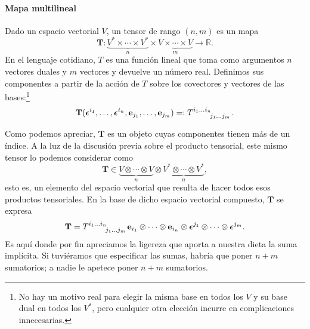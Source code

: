 \paragraph{Mapa multilineal} Dado un espacio vectorial \(V\), un tensor de rango \((n,m)\) es un mapa 
\begin{equation}
    \mathbf{T}: \underset{n}{\underbrace{V^*\times\cdots\times V^*}} \times\underset{m}{\underbrace{V\times\cdots\times V}} \rightarrow \mathbb{R}.
\end{equation}
En el lenguaje cotidiano, \(T\) es una función lineal que toma como argumentos \(n\) vectores duales y \(m\) vectores y devuelve un número real. Definimos sus componentes a partir de la acción de \(T\) sobre los covectores y vectores de las bases:\footnote{No hay un motivo real para elegir la misma base en todos los \(V\) y su base dual en todos los \(V^*\), pero cualquier otra elección incurre en complicaciones innecesarias.}
\begin{equation}
    \mathbf{T}(\boldsymbol{\epsilon}^{i_1}, \dots, \boldsymbol{\epsilon}^{i_n},\mathbf{e}_{j_1}, \dots, \mathbf{e}_{j_m}) =: \tensor{T}{^{i_1}^{...}^{i_n}_{j_1}_{...}_{j_m}}.
\end{equation}

Como podemos apreciar, \(\mathbf{T}\) es un objeto cuyas componentes tienen más de un índice. A la luz de la discusión previa sobre el producto tensorial, este mismo tensor lo podemos considerar como 
\begin{equation}
    \mathbf{T}\in \underset{n}{\underbrace{V\otimes \cdots\otimes V}}\otimes\underset{n}{\underbrace{V^*\otimes \cdots\otimes V^*}},
\end{equation}
esto es, un elemento del espacio vectorial que resulta de hacer todos esos productos tensoriales. En la base de dicho espacio vectorial compuesto, \(\mathbf{T}\) se expresa 
\begin{equation}
    \mathbf{T} = \tensor{T}{^{i_1}^{...}^{i_n}_{j_1}_{...}_{j_m}} \mathbf{e}_{i_1}\otimes\cdots\otimes\mathbf{e}_{i_n}\otimes\boldsymbol{\epsilon}^{j_1}\otimes\cdots\otimes\boldsymbol{\epsilon}^{j_m}.
\end{equation}
Es aquí donde por fin apreciamos la ligereza que aporta a nuestra dieta la suma implícita. Si tuviéramos que especificar las sumas, habría que poner \(n+m\) sumatorios; a nadie le apetece poner \(n+m\) sumatorios.

